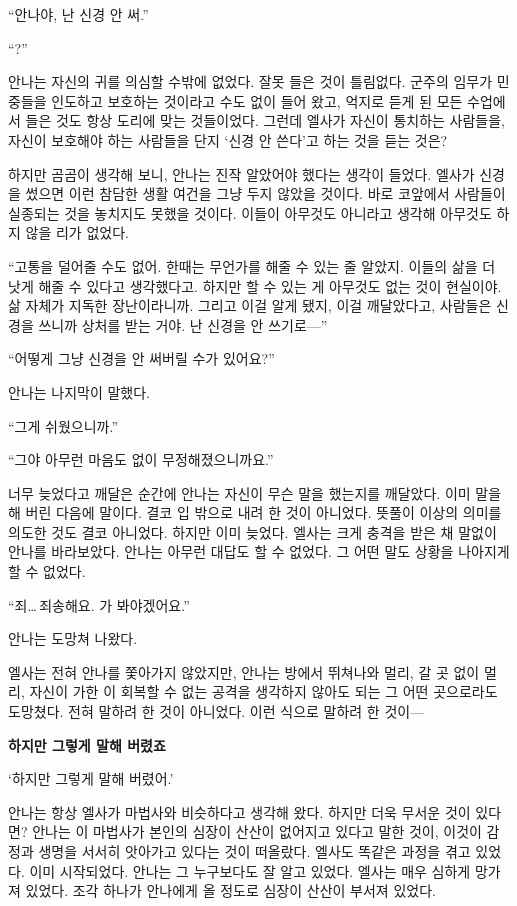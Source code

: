 ``안나야, 난 신경 안 써.''

``?''

안나는 자신의 귀를 의심할 수밖에 없었다. 잘못 들은 것이 틀림없다. 군주의 임무가 민중들을 인도하고 보호하는 것이라고 수도 없이 들어 왔고, 억지로 듣게 된 모든 수업에서 들은 것도 항상 도리에 맞는 것들이었다. 그런데 엘사가 자신이 통치하는 사람들을, 자신이 보호해야 하는 사람들을 단지 `신경 안 쓴다'고 하는 것을 듣는 것은?

하지만 곰곰이 생각해 보니, 안나는 진작 알았어야 했다는 생각이 들었다. 엘사가 신경을 썼으면 이런 참담한 생활 여건을 그냥 두지 않았을 것이다. 바로 코앞에서 사람들이 실종되는 것을 놓치지도 못했을 것이다. 이들이 아무것도 아니라고 생각해 아무것도 하지 않을 리가 없었다.

``고통을 덜어줄 수도 없어. 한때는 무언가를 해줄 수 있는 줄 알았지. 이들의 삶을 더 낫게 해줄 수 있다고 생각했다고. 하지만 할 수 있는 게 아무것도 없는 것이 현실이야. 삶 자체가 지독한 장난이라니까. 그리고 이걸 알게 됐지, 이걸 깨달았다고, 사람들은 신경을 쓰니까 상처를 받는 거야. 난 신경을 안 쓰기로—''

``어떻게 그냥 신경을 안 써버릴 수가 있어요?''

안나는 나지막이 말했다.

``그게 쉬웠으니까.''

``그야 아무런 마음도 없이 무정해졌으니까요.''

너무 늦었다고 깨달은 순간에 안나는 자신이 무슨 말을 했는지를 깨달았다. 이미 말을 해 버린 다음에 말이다. 결코 입 밖으로 내려 한 것이 아니었다. 뜻풀이 이상의 의미를 의도한 것도 결코 아니었다. 하지만 이미 늦었다. 엘사는 크게 충격을 받은 채 말없이 안나를 바라보았다. 안나는 아무런 대답도 할 수 없었다. 그 어떤 말도 상황을 나아지게 할 수 없었다.

``죄\ldots\,죄송해요. 가 봐야겠어요.''

안나는 도망쳐 나왔다.

엘사는 전혀 안나를 쫓아가지 않았지만, 안나는 방에서 뛰쳐나와 멀리, 갈 곳 없이 멀리, 자신이 가한 이 회복할 수 없는 공격을 생각하지 않아도 되는 그 어떤 곳으로라도 도망쳤다. 전혀 말하려 한 것이 아니었다. 이런 식으로 말하려 한 것이—

\textbf{하지만 그렇게 말해 버렸죠}

`하지만 그렇게 말해 버렸어.'

안나는 항상 엘사가 마법사와 비슷하다고 생각해 왔다. 하지만 더욱 무서운 것이 있다면? 안나는 이 마법사가 본인의 심장이 산산이 없어지고 있다고 말한 것이, 이것이 감정과 생명을 서서히 앗아가고 있다는 것이 떠올랐다. 엘사도 똑같은 과정을 겪고 있었다. 이미 시작되었다. 안나는 그 누구보다도 잘 알고 있었다. 엘사는 매우 심하게 망가져 있었다. 조각 하나가 안나에게 올 정도로 심장이 산산이 부서져 있었다.

